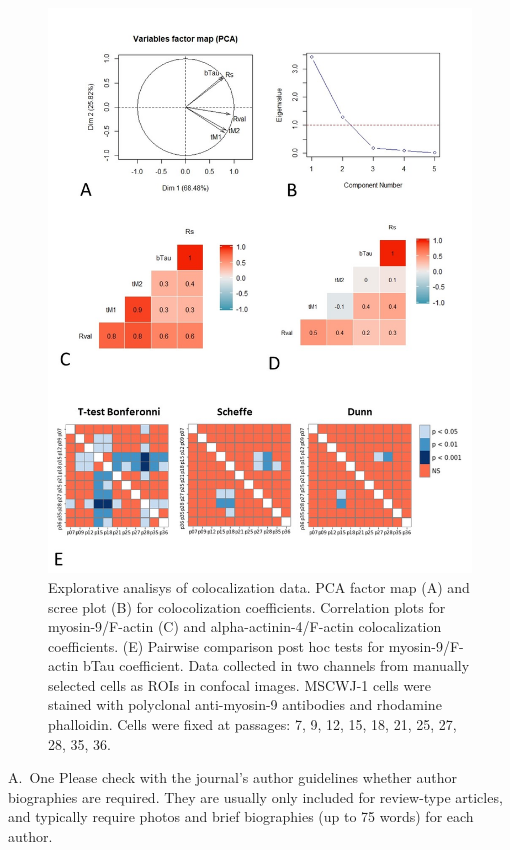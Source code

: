\documentclass[num-refs]{wiley-article}
\begin{document}
\begin{figure}[hbt!]
  \includegraphics[width=1\linewidth]{supp2.jpg}
  \caption{Explorative analisys of colocalization data.
  PCA factor map (A) and scree plot (B) for colocolization coefficients. Correlation plots for myosin-9/F-actin (C) and alpha-actinin-4/F-actin colocalization coefficients. (E) Pairwise comparison post hoc tests for myosin-9/F-actin bTau coefficient. Data collected in two channels from manually selected cells as ROIs in confocal images. MSCWJ-1 cells were stained with polyclonal anti-myosin-9 antibodies and rhodamine phalloidin. Cells were fixed at passages: 7, 9, 12, 15, 18, 21, 25, 27, 28, 35, 36.}
  \centering
\end{figure}


\printendnotes

% 
\iffalse
\begin{biography}{A.~One}
Please check with the journal's author guidelines whether author biographies are required. They are usually only included for review-type articles, and typically require photos and brief biographies (up to 75 words) for each author.
\bigskip
\bigskip
\end{biography}
\end{document}
